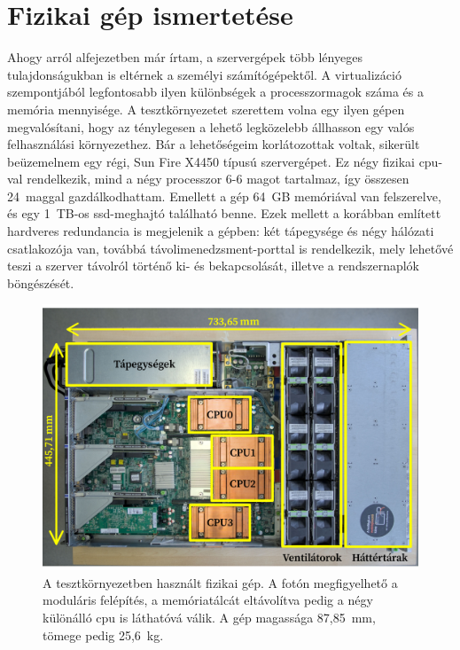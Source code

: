\section{Fizikai gép ismertetése}
Ahogy arról  alfejezetben már írtam, a szervergépek több lényeges tulajdonságukban is eltérnek a személyi számítógépektől. A virtualizáció szempontjából legfontosabb ilyen különbségek a processzormagok száma és a memória mennyisége. A tesztkörnyezetet szerettem volna egy ilyen gépen megvalósítani, hogy az ténylegesen a lehető legközelebb állhasson egy valós felhasználási környezethez. Bár a lehetőségeim korlátozottak voltak, sikerült beüzemelnem egy régi, Sun Fire X4450 típusú szervergépet. Ez négy fizikai \acrshort{cpu}-val rendelkezik, mind a négy processzor 6-6 magot tartalmaz, így összesen 24~maggal gazdálkodhattam. Emellett a gép 64~GB memóriával van felszerelve, és egy 1~TB-os \acrshort{ssd}-meghajtó található benne. Ezek mellett a korábban említett hardveres redundancia is megjelenik a gépben: két tápegysége és négy hálózati csatlakozója van, továbbá távolimenedzsment-porttal is rendelkezik, mely lehetővé teszi a szerver távolról történő ki- és bekapcsolását, illetve a rendszernaplók böngészését.

\begin{figure}[!ht]
	\centering
	\includegraphics[width=15cm]{figures/szerver-annotated.pdf}
	\caption{A tesztkörnyezetben használt fizikai gép. A fotón megfigyelhető a moduláris felépítés, a memóriatálcát eltávolítva pedig a négy különálló \acrshort{cpu} is láthatóvá válik. A gép magassága 87,85~mm, tömege pedig 25,6~kg.}
	\label{fig:server}
\end{figure}

